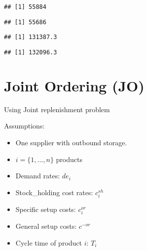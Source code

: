 \documentclass[
]{article}
\newenvironment{Shaded}{\begin{snugshade}}{\end{snugshade}}
\newcommand{\CommentTok}[1]{\textcolor[rgb]{0.56,0.35,0.01}{\textit{#1}}}
\newcommand{\KeywordTok}[1]{\textcolor[rgb]{0.13,0.29,0.53}{\textbf{#1}}}
\newcommand{\NormalTok}[1]{#1}
\newcommand{\OperatorTok}[1]{\textcolor[rgb]{0.81,0.36,0.00}{\textbf{#1}}}
\providecommand{\tightlist}{%
  \setlength{\itemsep}{0pt}\setlength{\parskip}{0pt}}
\begin{document}
\begin{verbatim}
## [1] 55884
\end{verbatim}

\begin{Shaded}
\end{Shaded}

\begin{verbatim}
## [1] 55686
\end{verbatim}

\begin{Shaded}
\end{Shaded}

\begin{verbatim}
## [1] 131387.3
\end{verbatim}

\begin{Shaded}
\end{Shaded}

\begin{verbatim}
## [1] 132096.3
\end{verbatim}

\hypertarget{joint-ordering-jo}{%
\section{Joint Ordering (JO)}\label{joint-ordering-jo}}

Using Joint replenishment problem

Assumptions:

\begin{itemize}
\tightlist
\item
  One supplier with outbound storage.
\item
  \(i=\{1,...,n\}\) products
\item
  Demand rates: \(de_i\)
\item
  Stock\_holding cost rates: \(c_i^{sh}\)
\item
  Specific setup costs: \(c_i^{or}\)
\item
  General setup costs: \(c^{-or}\)
\item
  Cycle time of product \(i\): \(T_i\)
\end{itemize}
\end{document}
